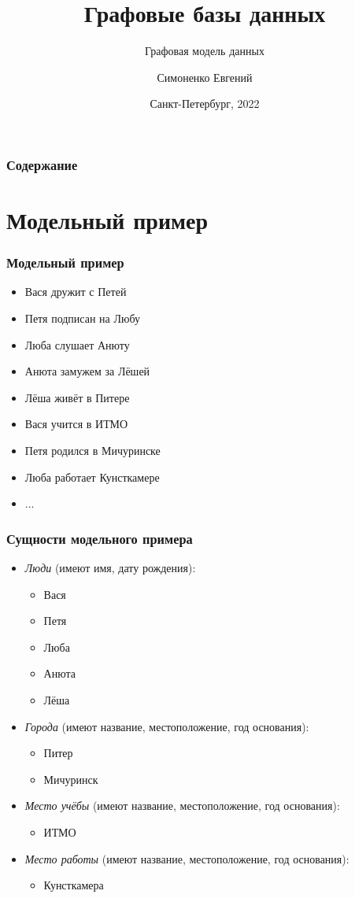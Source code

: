 \documentclass[11pt]{beamer}
\title[Графовые СУБД]{Графовые базы данных}
\subtitle{Графовая модель данных}
\author[]{Симоненко Евгений}
\institute[]{Университет ИТМО}
\date[]{Санкт-Петербург, 2022}
\begin{document}
\begin{frame}
  \titlepage
\end{frame}

\begin{frame}
  \frametitle{Содержание}
  \tableofcontents
\end{frame}

\section{Модельный пример}

\begin{frame}
  \frametitle{Модельный пример}
  \begin{itemize}
  \item Вася дружит с Петей
  \item Петя подписан на Любу
  \item Люба слушает Анюту
  \item Анюта замужем за Лёшей
  \item Лёша живёт в Питере
  \item Вася учится в ИТМО
  \item Петя родился в Мичуринске
  \item Люба работает Кунсткамере
  \item ...
  \end{itemize}
\end{frame}

\begin{frame}
  \frametitle{Сущности модельного примера}
  \begin{itemize}
  \item \emph{Люди} (имеют имя, дату рождения):
    \begin{itemize}
    \item Вася
    \item Петя
    \item Люба
    \item Анюта
    \item Лёша
    \end{itemize}
  \item \emph{Города} (имеют название, местоположение, год основания):
    \begin{itemize}
    \item Питер
    \item Мичуринск
    \end{itemize}
  \item \emph{Место учёбы} (имеют название, местоположение, год основания):
    \begin{itemize}
    \item ИТМО
    \end{itemize}
  \item \emph{Место работы} (имеют название, местоположение, год основания):
    \begin{itemize}
    \item Кунсткамера
    \end{itemize}
  \end{itemize}
\end{frame}
\end{document}
